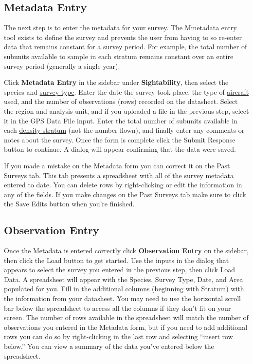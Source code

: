 \documentclass[
]{book}
\begin{document}
\hypertarget{metadata-entry}{%
\subsection{Metadata Entry}\label{metadata-entry}}

The next step is to enter the metadata for your survey. The Mmetadata entry tool exists to define the survey and prevents the user from having to so re-enter data that remains constant for a survey period. For example, the total number of subunits available to sample in each stratum remains constant over an entire survey period (generally a single year).

Click \textbf{Metadata Entry} in the sidebar under \textbf{Sightability}, then select the species and \protect\hyperlink{gl-sight-survey}{survey type}. Enter the date the survey took place, the type of \protect\hyperlink{gl-aircraft}{aircraft} used, and the number of observations (rows) recorded on the datasheet. Select the region and analysis unit, and if you uploaded a file in the previous step, select it in the GPS Data File input. Enter the total number of subunits available in each \protect\hyperlink{gl-stratum}{density stratum} (not the number flown), and finally enter any comments or notes about the survey. Once the form is complete click the {Submit Response} button to continue. A dialog will appear confirming that the data were saved.

If you made a mistake on the Metadata form you can correct it on the Past Surveys tab. This tab presents a spreadsheet with all of the survey metadata entered to date. You can delete rows by right-clicking or edit the information in any of the fields. If you make changes on the Past Surveys tab make sure to click the {Save Edits} button when you're finished.

\hypertarget{observation-entry}{%
\subsection{Observation Entry}\label{observation-entry}}

Once the Metadata is entered correctly click \textbf{Observation Entry} on the sidebar, then click the {Load} button to get started. Use the inputs in the dialog that appears to select the survey you entered in the previous step, then click {Load Data}. A spreadsheet will appear with the Species, Survey Type, Date, and Area populated for you. Fill in the additional columns (beginning with Stratum) with the information from your datasheet. You may need to use the horizontal scroll bar below the spreadsheet to access all the columns if they don't fit on your screen. The number of rows available in the spreadsheet will match the number of observations you entered in the Metadata form, but if you need to add additional rows you can do so by right-clicking in the last row and selecting ``insert row below.'' You can view a summary of the data you've entered below the spreadsheet.
\end{document}
